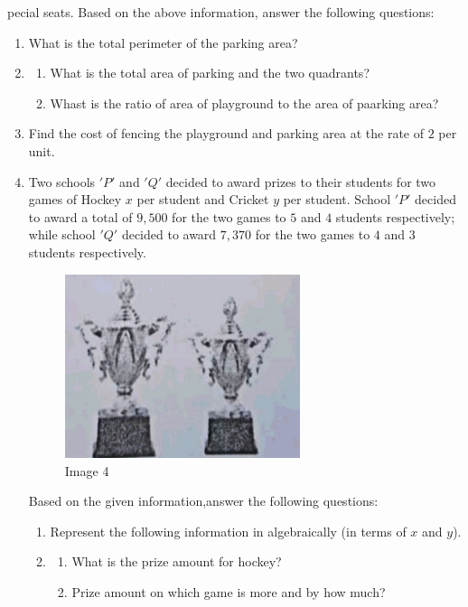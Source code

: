 \documentclass[12pt,-letter paper]{article}
\begin{document}
\begin{enumerate}
pecial seats.
Based on the above information, answer the following questions:
\begin{enumerate}
\item
What is the total perimeter of the parking area?
\item
\begin{enumerate}
\item
What is the total area of parking and the two quadrants?
\item
Whast is the ratio of area of playground to the area of paarking area?
\end{enumerate}
\item
Find the cost of fencing the playground and parking area at the rate of \rupee $2$ per unit.
\newpage
\item
Two schools $'P'$ and $'Q'$ decided to award prizes to their students for two games of Hockey \rupee $x$ per student and Cricket \rupee $y$ per student. School $'P'$ decided to award a total of \rupee $9,500$ for the two games to $5$ and $4$ students respectively; while school $'Q'$ decided to award
 \rupee $7,370$ for the two games to $4$ and $3$ students respectively.
\begin{figure}[h!]
\centering
\includegraphics[width=0.65\textwidth]{img4.jpg}
\caption{Image 4}
\end{figure}
Based on the given information,answer the following questions:
\begin{enumerate}
\item
Represent the following information in algebraically (in terms of $x$ and $y$).
\item
\begin{enumerate}
\item
What is the prize amount for hockey?
\item
Prize amount on which game is more and by how much?
\end{enumerate}

\end{enumerate}
\end{enumerate}
\end{enumerate}
\end{document}
